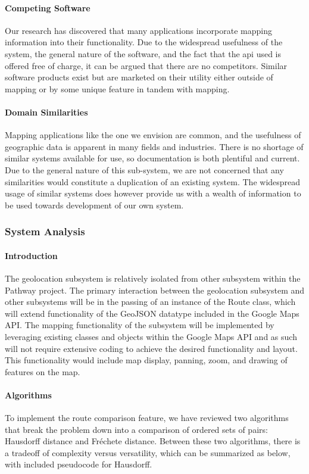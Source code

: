 \documentclass{article}
\begin{document}
\paragraph{Competing Software}
Our research has discovered that many applications incorporate mapping information into their functionality. Due to the widespread usefulness of the system, the general nature of the software, and the fact that the api used is offered free of charge, it can be argued that there are no competitors. Similar software products exist but are marketed on their utility either outside of mapping or by some unique feature in tandem with mapping.

\paragraph{Domain Similarities}
Mapping applications like the one we envision are common, and the usefulness of geographic data is apparent in many fields and industries. There is no shortage of similar systems available for use, so documentation is both plentiful and current. Due to the general nature of this sub-system, we are not concerned that any similarities would constitute a duplication of an existing system. The widespread usage of similar systems does however provide us with a wealth of information to be used towards development of our own system.

\subsubsection{System Analysis}
\paragraph{Introduction}
The geolocation subsystem is relatively isolated from other subsystem within the Pathway project. The primary interaction between the geolocation 
subsystem and other subsystems will be in the passing of an instance of the Route class, which will extend functionality of the GeoJSON datatype 
included in the Google Maps API. The mapping functionality of the subsystem will be implemented by leveraging existing classes and objects within 
the Google Maps API and as such will not require extensive coding to achieve the desired functionality and layout. 
This functionality would include map display, panning, zoom, and drawing of features on the map.


\paragraph{Algorithms}
To implement the route comparison feature, we have reviewed two algorithms that break the problem down into a comparison of ordered sets of pairs: 
Hausdorff distance and Fréchete distance. Between these two algorithms, there is a tradeoff of complexity versus versatility, 
which can be summarized as below, with included pseudocode for Hausdorff.
\end{document}
